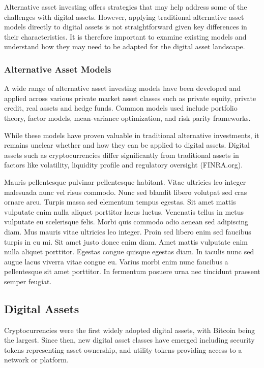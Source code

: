 \documentclass{ledger}
\begin{document}
Alternative asset investing offers strategies that may help address some of the challenges with digital assets. However, applying traditional alternative asset models directly to digital assets is not straightforward given key differences in their characteristics. It is therefore important to examine existing models and understand how they may need to be adapted for the digital asset landscape.

\subsubsection{Alternative Asset Models}
A wide range of alternative asset investing models have been developed and applied across various private market asset classes such as private equity, private credit, real assets and hedge funds. Common models used include portfolio theory, factor models, mean-variance optimization, and risk parity frameworks.

While these models have proven valuable in traditional alternative investments, it remains unclear whether and how they can be applied to digital assets. Digital assets such as cryptocurrencies differ significantly from traditional assets in factors like volatility, liquidity profile and regulatory oversight (FINRA.org).

Mauris pellentesque pulvinar pellentesque habitant. Vitae ultricies leo integer malesuada nunc vel risus commodo. Nunc sed blandit libero volutpat sed cras ornare arcu. Turpis massa sed elementum tempus egestas. Sit amet mattis vulputate enim nulla aliquet porttitor lacus luctus. Venenatis tellus in metus vulputate eu scelerisque felis. Morbi quis commodo odio aenean sed adipiscing diam. Mus mauris vitae ultricies leo integer. Proin sed libero enim sed faucibus turpis in eu mi. Sit amet justo donec enim diam. Amet mattis vulputate enim nulla aliquet porttitor. Egestas congue quisque egestas diam. In iaculis nunc sed augue lacus viverra vitae congue eu. Varius morbi enim nunc faucibus a pellentesque sit amet porttitor. In fermentum posuere urna nec tincidunt praesent semper feugiat.

\subsection {Digital Assets}
Cryptocurrencies were the first widely adopted digital assets, with Bitcoin being the largest. Since then, new digital asset classes have emerged including security tokens representing asset ownership, and utility tokens providing access to a network or platform.
\end{document}
